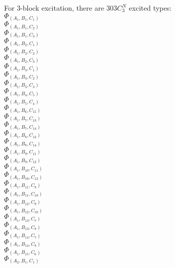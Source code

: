 \documentclass[14pt]{article}
\begin{document}
    For 3-block excitation, there are $ 303C^N_3 $ excited types: \\ 
    $\Phi_{({A}_{1}, {B}_{1}, {C}_{1})}$ \\ 
    $\Phi_{({A}_{1}, {B}_{1}, {C}_{2})}$ \\ 
    $\Phi_{({A}_{1}, {B}_{1}, {C}_{3})}$ \\ 
    $\Phi_{({A}_{1}, {B}_{2}, {C}_{1})}$ \\ 
    $\Phi_{({A}_{1}, {B}_{2}, {C}_{2})}$ \\ 
    $\Phi_{({A}_{1}, {B}_{2}, {C}_{3})}$ \\ 
    $\Phi_{({A}_{1}, {B}_{3}, {C}_{1})}$ \\ 
    $\Phi_{({A}_{1}, {B}_{3}, {C}_{2})}$ \\ 
    $\Phi_{({A}_{1}, {B}_{3}, {C}_{3})}$ \\ 
    $\Phi_{({A}_{1}, {B}_{4}, {C}_{5})}$ \\ 
    $\Phi_{({A}_{1}, {B}_{5}, {C}_{4})}$ \\ 
    $\Phi_{({A}_{1}, {B}_{6}, {C}_{15})}$ \\ 
    $\Phi_{({A}_{1}, {B}_{7}, {C}_{13})}$ \\ 
    $\Phi_{({A}_{1}, {B}_{7}, {C}_{14})}$ \\ 
    $\Phi_{({A}_{1}, {B}_{8}, {C}_{13})}$ \\ 
    $\Phi_{({A}_{1}, {B}_{8}, {C}_{14})}$ \\ 
    $\Phi_{({A}_{1}, {B}_{9}, {C}_{11})}$ \\ 
    $\Phi_{({A}_{1}, {B}_{9}, {C}_{12})}$ \\ 
    $\Phi_{({A}_{1}, {B}_{10}, {C}_{11})}$ \\ 
    $\Phi_{({A}_{1}, {B}_{10}, {C}_{12})}$ \\ 
    $\Phi_{({A}_{1}, {B}_{11}, {C}_{9})}$ \\ 
    $\Phi_{({A}_{1}, {B}_{11}, {C}_{10})}$ \\ 
    $\Phi_{({A}_{1}, {B}_{12}, {C}_{9})}$ \\ 
    $\Phi_{({A}_{1}, {B}_{12}, {C}_{10})}$ \\ 
    $\Phi_{({A}_{1}, {B}_{13}, {C}_{7})}$ \\ 
    $\Phi_{({A}_{1}, {B}_{13}, {C}_{8})}$ \\ 
    $\Phi_{({A}_{1}, {B}_{14}, {C}_{7})}$ \\ 
    $\Phi_{({A}_{1}, {B}_{14}, {C}_{8})}$ \\ 
    $\Phi_{({A}_{1}, {B}_{15}, {C}_{6})}$ \\ 
    $\Phi_{({A}_{2}, {B}_{1}, {C}_{1})}$ \\ 
\end{document}
